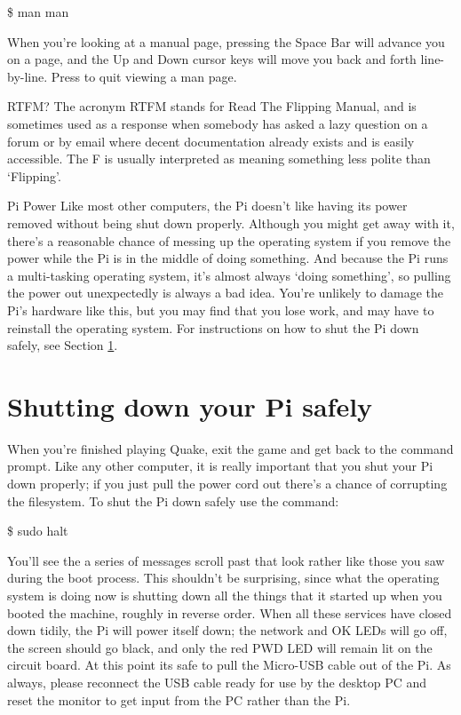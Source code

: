 \begin{ttoutenv}
\$ man man
\end{ttoutenv}

\noindent When you're looking at a manual page, pressing the Space Bar will advance you on a page, and the Up and Down cursor keys will move you back and forth line-by-line. Press  to quit viewing a man page.

\begin{diversion}{RTFM?}
The acronym RTFM stands for Read The Flipping Manual, and is sometimes used as a response when somebody has asked a lazy question on a forum or by email where decent documentation already exists and is easily accessible. The F is usually interpreted as meaning something less polite than `Flipping'.
\end{diversion}

\FloatBarrier

\begin{danger}{Pi Power}
Like most other computers, the Pi doesn't like having its power removed without being shut down properly. Although you might get away with it, there's a reasonable chance of messing up the operating system if you remove the power while the Pi is in the middle of doing something. And because the Pi runs a multi-tasking operating system, it's almost always `doing something', so pulling the power out unexpectedly is always a bad idea. You're unlikely to damage the Pi's hardware like this, but you may find that you lose work, and may have to reinstall the operating system. For instructions on how to shut the Pi down safely, see Section \ref{section:shutdown}.
\end{danger}

\section{Shutting down your Pi safely}
\label{section:shutdown}

When you're finished playing Quake, exit the game and get back to the command prompt. Like any other computer, it is really important that you shut your Pi down properly; if you just pull the power cord out there's a chance of corrupting the filesystem. To shut the Pi down safely use the  command:

\begin{ttoutenv}
\$ sudo halt
\end{ttoutenv}

\noindent You'll see the a series of messages scroll past that look rather like those you saw during the boot process. This shouldn't be surprising, since what the operating system is doing now is shutting down all the things that it started up when you booted the machine, roughly in reverse order. When all these services have closed down tidily, the Pi will power itself down; the network  and OK LEDs will go off, the screen should go black, and only the red PWD LED will remain lit on the circuit board. At this point its safe to pull the Micro-USB cable out of the Pi. As always, please reconnect the USB cable ready for use by the desktop PC and reset the monitor to get input from the PC rather than the Pi.


